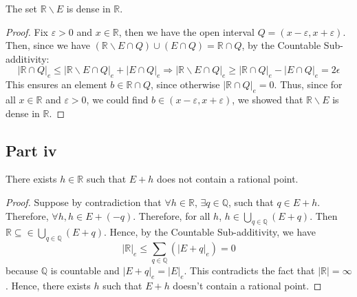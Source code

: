 \begin{question}
   The set $\mathbb{R} \backslash E$ is dense in $\mathbb{R}$.
\end{question}

\begin{answer}
    \begin{proof}
        Fix $\varepsilon > 0$ and $x \in \mathbb{R}$, then we have the open interval $Q = (x - \varepsilon, x + \varepsilon)$. Then, since we have $(\mathbb{R}\backslash E\cap Q)\cup (E\cap Q) = \mathbb{R}\cap Q$, by the Countable Sub-additivity:
        \begin{equation}
            \lvert \mathbb{R}\cap Q \rvert_e \leq \lvert \mathbb{R}\backslash E\cap Q \rvert_e + \lvert E \cap Q \rvert_e \Rightarrow \lvert \mathbb{R}\backslash E\cap Q \rvert_e \geq \lvert \mathbb{R}\cap Q \rvert_e - \lvert E \cap Q \rvert_e  = 2\epsilon
        \end{equation}
        This ensures an element $b \in \mathbb{R} \cap Q$, since otherwise $\lvert \mathbb{R} \cap Q \rvert_e = 0$. Thus, since for all $x \in \mathbb{R}$ and $\varepsilon > 0$, we could find $b \in (x - \varepsilon, x + \varepsilon)$, we showed that $\mathbb{R} \backslash E$ is dense in $\mathbb{R}$.
    \end{proof}
\end{answer}

\subsection{Part iv}

\begin{question}
   There exists $h \in \mathbb{R}$ such that $E+h$ does not contain a rational point.
\end{question}

\begin{answer}
    \begin{proof}
        Suppose by contradiction that $\forall h \in \mathbb{R}$, $\exists q \in \mathbb{Q}$, such that $q \in E + h$. Therefore, $\forall h, h \in E + (-q)$. Therefore, for all $h$, $h \in \bigcup_{q \in \mathbb{Q}}(E+q)$. Then $\mathbb{R} \subseteq \in \bigcup_{q \in \mathbb{Q}}(E+q)$. Hence, by the Countable Sub-additivity, we have
        \begin{equation}
            \lvert \mathbb{R} \rvert_e \leq \sum_{q \in \mathbb{Q}}(\lvert E + q \rvert_e) = 0
        \end{equation}
        because $\mathbb{Q}$ is countable and $\lvert E + q \rvert_e = \lvert E \rvert_e$. This contradicts the fact that $\lvert \mathbb{R} \rvert = \infty$. Hence, there exists $h$ such that $E+h$ doesn't contain a rational point.
    \end{proof}
\end{answer}